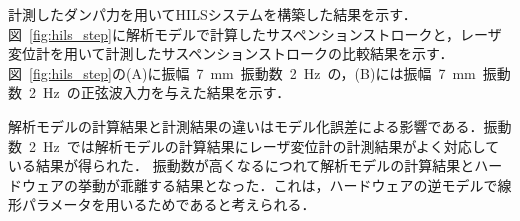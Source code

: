 \documentclass{article_vdlab_sotsuron_youshi}
\begin{document}
\vspace{-1mm}
\par
計測したダンパ力を用いてHILSシステムを構築した結果を示す．図~\ref{fig:hils_step}に解析モデルで計算したサスペンションストロークと，レーザ変位計を用いて計測したサスペンションストロークの比較結果を示す．
図~\ref{fig:hils_step}の(A)に振幅~7~mm~振動数~2~Hz~の，(B)には振幅~7~mm~振動数~2~Hz~の正弦波入力を与えた結果を示す．
\par
解析モデルの計算結果と計測結果の違いはモデル化誤差による影響である．振動数~2~Hz~では解析モデルの計算結果にレーザ変位計の計測結果がよく対応している結果が得られた．
振動数が高くなるにつれて解析モデルの計算結果とハードウェアの挙動が乖離する結果となった．これは，ハードウェアの逆モデルで線形パラメータを用いるためであると考えられる．
\end{document}

